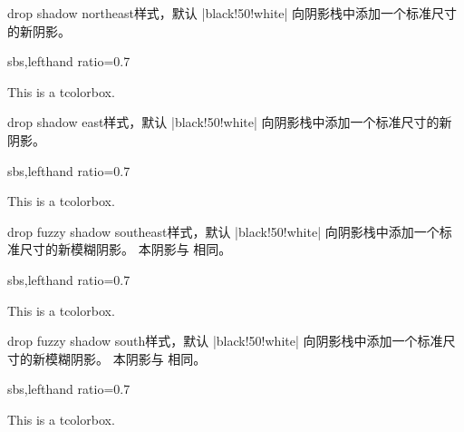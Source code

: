 \clearpage
\begin{docTcbKey}{drop shadow northeast}{}{样式，默认 |black!50!white|}
  向阴影栈中添加一个标准尺寸的新阴影。
\begin{dispExample*}{sbs,lefthand ratio=0.7}
\begin{tcolorbox}[drop shadow northeast,
  enhanced,colback=red!5!white,colframe=red!75!black]
  This is a tcolorbox.
\end{tcolorbox}
\end{dispExample*}
\end{docTcbKey}%

\begin{docTcbKey}{drop shadow east}{}{样式，默认 |black!50!white|}
  向阴影栈中添加一个标准尺寸的新阴影。
\begin{dispExample*}{sbs,lefthand ratio=0.7}
\begin{tcolorbox}[drop shadow east,
  enhanced,colback=red!5!white,colframe=red!75!black]
  This is a tcolorbox.
\end{tcolorbox}
\end{dispExample*}
\end{docTcbKey}%


\begin{docTcbKey}{drop fuzzy shadow southeast}{}{样式，默认 |black!50!white|}
  向阴影栈中添加一个标准尺寸的新模糊阴影。
  本阴影与  相同。
\begin{dispExample*}{sbs,lefthand ratio=0.7}
\begin{tcolorbox}[drop fuzzy shadow southeast,
  enhanced,colback=red!5!white,colframe=red!75!black]
  This is a tcolorbox.
\end{tcolorbox}
\end{dispExample*}
\end{docTcbKey}%

\begin{docTcbKey}{drop fuzzy shadow south}{}{样式，默认 |black!50!white|}
  向阴影栈中添加一个标准尺寸的新模糊阴影。
  本阴影与  相同。
\begin{dispExample*}{sbs,lefthand ratio=0.7}
\begin{tcolorbox}[drop fuzzy shadow south,
  enhanced,colback=red!5!white,colframe=red!75!black]
  This is a tcolorbox.
\end{tcolorbox}
\end{dispExample*}
\end{docTcbKey}%

